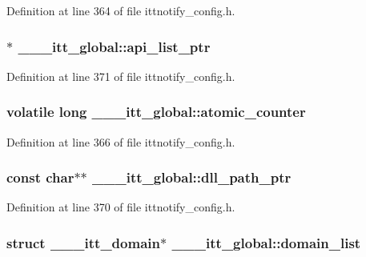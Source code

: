 Definition at line 364 of file ittnotify\-\_\-config.\-h.

\hypertarget{struct______itt__global_aad92b41f5e69bea276e464b4037d0b95}{
\subsubsection[{api\-\_\-list\-\_\-ptr}]{$\ast$ \-\_\-\-\_\-\-\_\-itt\-\_\-global\-::api\-\_\-list\-\_\-ptr}}\label{struct______itt__global_aad92b41f5e69bea276e464b4037d0b95}


Definition at line 371 of file ittnotify\-\_\-config.\-h.

\hypertarget{struct______itt__global_a43a21d694a84edc516d1d4cc07d65313}{
\subsubsection[{atomic\-\_\-counter}]{\setlength{\rightskip}{0pt plus 5cm}volatile long \-\_\-\-\_\-\-\_\-itt\-\_\-global\-::atomic\-\_\-counter}}\label{struct______itt__global_a43a21d694a84edc516d1d4cc07d65313}


Definition at line 366 of file ittnotify\-\_\-config.\-h.

\hypertarget{struct______itt__global_a809581305da5391f26bd268673155ec7}{
\subsubsection[{dll\-\_\-path\-\_\-ptr}]{\setlength{\rightskip}{0pt plus 5cm}const char$\ast$$\ast$ \-\_\-\-\_\-\-\_\-itt\-\_\-global\-::dll\-\_\-path\-\_\-ptr}}\label{struct______itt__global_a809581305da5391f26bd268673155ec7}


Definition at line 370 of file ittnotify\-\_\-config.\-h.

\hypertarget{struct______itt__global_a0eb1e7fa6a1bfd35ec682a3998aae7b6}{
\subsubsection[{domain\-\_\-list}]{\setlength{\rightskip}{0pt plus 5cm}struct \-\_\-\-\_\-\-\_\-itt\-\_\-domain$\ast$ \-\_\-\-\_\-\-\_\-itt\-\_\-global\-::domain\-\_\-list}}\label{struct______itt__global_a0eb1e7fa6a1bfd35ec682a3998aae7b6}


